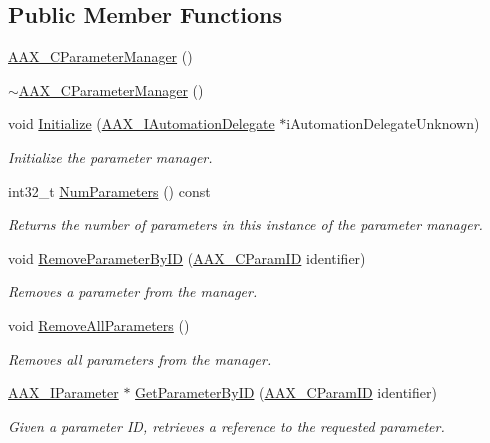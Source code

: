 \subsection*{Public Member Functions}
\begin{DoxyCompactItemize}
\item 
\hyperlink{a00034_a2464652c52cc61b437339a5268ee4f66}{A\+A\+X\+\_\+\+C\+Parameter\+Manager} ()
\item 
\hyperlink{a00034_a86e327094928b44b1ca11ef145d4f301}{$\sim$\+A\+A\+X\+\_\+\+C\+Parameter\+Manager} ()
\item 
void \hyperlink{a00034_ab7921f8b312d65917e3b38c5edfb57d8}{Initialize} (\hyperlink{a00086}{A\+A\+X\+\_\+\+I\+Automation\+Delegate} $\ast$i\+Automation\+Delegate\+Unknown)
\begin{DoxyCompactList}\small\item\em Initialize the parameter manager. \end{DoxyCompactList}\item 
int32\+\_\+t \hyperlink{a00034_a33e7ac884dd492b51cfea3d8eb163626}{Num\+Parameters} () const 
\begin{DoxyCompactList}\small\item\em Returns the number of parameters in this instance of the parameter manager. \end{DoxyCompactList}\item 
void \hyperlink{a00034_a1c37068e235b493a6aa2a57fa26379ba}{Remove\+Parameter\+By\+I\+D} (\hyperlink{a00149_a1440c756fe5cb158b78193b2fc1780d1}{A\+A\+X\+\_\+\+C\+Param\+I\+D} identifier)
\begin{DoxyCompactList}\small\item\em Removes a parameter from the manager. \end{DoxyCompactList}\item 
void \hyperlink{a00034_a6bbfed26d6dda840c89df90b66c196ac}{Remove\+All\+Parameters} ()
\begin{DoxyCompactList}\small\item\em Removes all parameters from the manager. \end{DoxyCompactList}\item 
\hyperlink{a00108}{A\+A\+X\+\_\+\+I\+Parameter} $\ast$ \hyperlink{a00034_a405918dfca50993f8c0b5259b3c5ee95}{Get\+Parameter\+By\+I\+D} (\hyperlink{a00149_a1440c756fe5cb158b78193b2fc1780d1}{A\+A\+X\+\_\+\+C\+Param\+I\+D} identifier)
\begin{DoxyCompactList}\small\item\em Given a parameter I\+D, retrieves a reference to the requested parameter. \end{DoxyCompactList}\item 

\end{DoxyCompactItemize}
